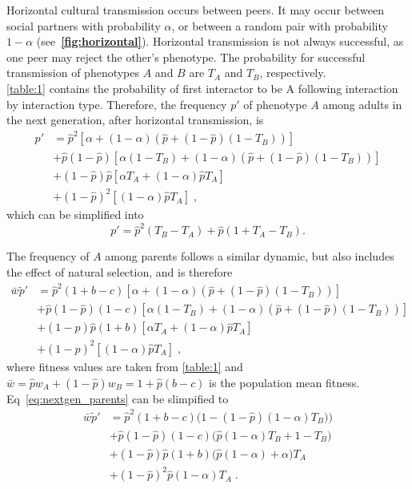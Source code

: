 \documentclass[12pt]{extarticle}
\begin{document}
Horizontal cultural transmission occurs between peers. 
It may occur between social partners with probability $\alpha$, or between a random pair with probability $1-\alpha$ (see~\textbf{\autoref{fig:horizontal}}).
Horizontal transmission is not always successful, as one peer may reject the other's phenotype. The probability for successful transmission of phenotypes $A$ and $B$ are $T_A$ and $T_B$, respectively.\\
\autoref{table:1} contains the probability of first interactor to be A following interaction by interaction type.
Therefore, the frequency $p'$ of phenotype $A$ among adults in the next generation, after horizontal transmission, is 
\begin{equation}\label{eq:nextgen_adults}
\begin{aligned}
p'
& = \hat{p}^2 [\alpha + (1-\alpha)(\hat{p} + (1-\hat{p})(1-T_B))] \\
& + \hat{p}(1-\hat{p}) [\alpha(1-T_B) + (1-\alpha)(\hat{p} + (1-\hat{p})(1-T_B))] \\
& + (1-\hat{p})\hat{p} [\alpha T_A + (1-\alpha) \hat{p} T_A ] \\
& + (1-\hat{p})^2 [(1-\alpha) \hat{p} T_A] \;,
\end{aligned}
\end{equation}
which can be simplified into
\begin{equation}\label{eq:nextgen_adults_slimpify}
p' = \hat{p}^2(T_B-T_A) + \hat{p}(1+T_A-T_B) .
\end{equation}

The frequency of $A$ among parents follows a similar dynamic, but also includes the effect of natural selection, and is therefore
\begin{equation}\label{eq:nextgen_parents}
\begin{aligned}
\bar{w} \tilde{p}'
& = \hat{p}^2 (1+b-c) [\alpha + (1-\alpha)(\hat{p} + (1-\hat{p})(1-T_B))] \\
& + \hat{p}(1-\hat{p}) (1-c) [\alpha(1-T_B) + (1-\alpha)(\hat{p} + (1-\hat{p})(1-T_B))] \\
& + (1-\hat{p})\hat{p} (1+b) [\alpha T_A + (1-\alpha) \hat{p} T_A ] \\
& + (1-\hat{p})^2 [(1-\alpha) \hat{p} T_A] \;,
\end{aligned}
\end{equation}
where fitness values are taken from \autoref{table:1} and $\bar{w} = \hat{p} w_A + (1-\hat{p}) w_B = 1 + \hat{p}(b-c)$ is the population mean fitness.
Eq~\ref{eq:nextgen_parents} can be slimpified to
\begin{equation}\label{eq:nextgen_parents_simplified}
\begin{aligned}
\bar{w} \tilde{p}'
& = \hat{p}^2 (1+b-c) \big(1-(1-\hat{p})(1-\alpha)T_B)\big) \\
& + \hat{p}(1-\hat{p}) (1-c) \big(\hat{p}(1-\alpha)T_B+1-T_B\big) \\
& + (1-\hat{p})\hat{p} (1+b) \big(\hat{p}(1-\alpha) + \alpha\big) T_A \\
& + (1-\hat{p})^2 \hat{p} (1-\alpha) T_A \;.
\end{aligned}
\end{equation}
\end{document}
